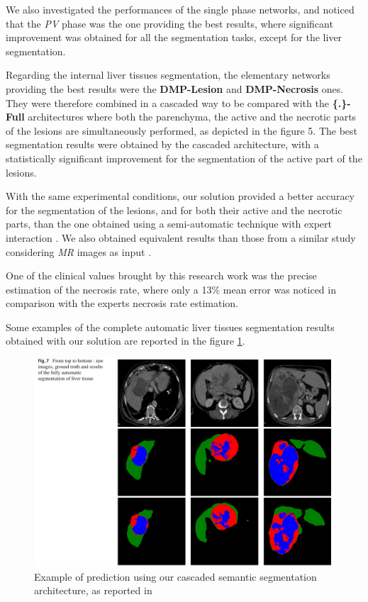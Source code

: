 \documentclass[]{article}
\newcommand{\pplfont}[1]{{\textbf{\fontfamily{ppl}\selectfont #1}}}
\begin{document}
	We also investigated the performances of the single phase networks, and
	noticed that the \emph{PV} phase was the one providing the best results,
	where significant improvement was obtained for all the segmentation
	tasks, except for the liver segmentation.
	
	Regarding the internal liver tissues segmentation, the elementary
	networks providing the best results were the \pplfont{DMP-Lesion} and \pplfont{DMP-Necrosis}
	ones. They were therefore combined in a cascaded way to be compared with
	the \pplfont{\{.\}-Full} architectures where both the parenchyma, the active and
	the necrotic parts of the lesions are simultaneously performed, as
	depicted in the figure 5. The best segmentation results were obtained by
	the cascaded architecture, with a statistically significant improvement
	for the segmentation of the active part of the lesions.
	
	With the same experimental conditions, our solution provided a better
	accuracy for the segmentation of the lesions, and for both their active
	and the necrotic parts, than the one obtained using a semi-automatic
	technique with expert interaction \cite{Ouhmich2019}. We also
	obtained equivalent results than those from a similar study considering
	\emph{MR} images as input \cite{Zhang2018}.
	
	One of the clinical values brought by this research work was the precise
	estimation of the necrosis rate, where only a 13\% mean error was
	noticed in comparison with the experts necrosis rate estimation.
	
	Some examples of the complete automatic liver tissues
	segmentation results obtained with our solution are reported in the figure \ref{pred_CARS}.
	
	
	\begin{figure}[th!]
		\centering
		\includegraphics[width=0.7\linewidth]{images/image22}
		\caption{Example of prediction using our cascaded semantic segmentation architecture, as reported in \cite{Ouhmich2019}}
		\label{pred_CARS}
	\end{figure}
	
	\newpage
	
	
	
	
\end{document}

